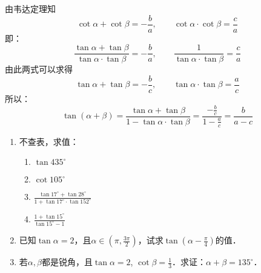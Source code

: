 \begin{solution}
由韦达定理知
\[\cot\alpha+\cot\beta=-\frac{b}{a},\qquad \cot\alpha\cdot \cot\beta=\frac{c}{a}\]    
即：
\[\frac{\tan\alpha+\tan\beta}{\tan\alpha\cdot \tan\beta}=-\frac{b}{a},\qquad \frac{1}{\tan\alpha\cdot \tan\beta}=\frac{c}{a}\]  
由此两式可以求得 
\[\tan\alpha+\tan\beta=-\frac{b}{c},\qquad \tan\alpha\cdot \tan\beta=\frac{a}{c}\]
所以：
\[\tan(\alpha+\beta)=\frac{\tan\alpha+\tan\beta}{1-\tan\alpha\cdot \tan\beta}=\frac{-\frac{b}{c}}{1-\frac{a}{c}}=\frac{b}{a-c}\]
\end{solution}

\begin{ex}
\begin{enumerate}
    \item 不查表，求值：
\begin{multicols}{2}
\begin{enumerate}
    \item $\tan 435^{\circ}$
    \item $\cot 105^{\circ}$
    \item $\frac{\tan 17^{\circ}+\tan 28^{\circ}}{1+\tan 17^{\circ}\cdot \tan 152^{\circ}}$
    \item $\frac{1+\tan 15^{\circ}}{\tan 15^{\circ}-1}$
\end{enumerate}
\end{multicols}

\item 已知$\tan\alpha=2$，且$\alpha\in\left(\pi,\frac{3\pi}{2}\right)$，试求$\tan\left(\alpha-\frac{\pi}{4}\right)$的值．
\item 若$\alpha,\beta$都是锐角，且$\tan\alpha=2$, $\cot\beta=\frac{1}{3}$．求证：$\alpha+\beta =135^{\circ}$．
\end{enumerate} 
\end{ex}


